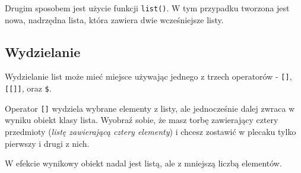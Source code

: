 \documentclass[paper=6in:9in,pagesize=pdftex,headinclude=on,footinclude=on,10pt]{scrbook}
\newenvironment{Shaded}{\begin{snugshade}}{\end{snugshade}}
\newcommand{\CommentTok}[1]{\textcolor[rgb]{0.56,0.35,0.01}{\textit{#1}}}
\newcommand{\DecValTok}[1]{\textcolor[rgb]{0.00,0.00,0.81}{#1}}
\newcommand{\KeywordTok}[1]{\textcolor[rgb]{0.13,0.29,0.53}{\textbf{#1}}}
\newcommand{\NormalTok}[1]{#1}
\newcommand{\StringTok}[1]{\textcolor[rgb]{0.31,0.60,0.02}{#1}}
\begin{document}
Drugim sposobem jest użycie funkcji \texttt{list()}.
W tym przypadku tworzona jest nowa, nadrzędna lista, która zawiera dwie wcześniejsze listy.

\begin{Shaded}
\end{Shaded}

\hypertarget{wydzielanie-list}{%
\subsection{Wydzielanie}\label{wydzielanie-list}}

Wydzielanie list może mieć miejsce używając jednego z trzech operatorów - \texttt{{[}{]}}, \texttt{{[}{[}{]}{]}}, oraz \texttt{\$}.

Operator \texttt{{[}{]}} wydziela wybrane elementy z listy, ale jednocześnie dalej zwraca w wyniku obiekt klasy lista.
Wyobraź sobie, że masz torbę zawierający cztery przedmioty (\emph{listę zawierającą cztery elementy}) i chcesz zostawić w plecaku tylko pierwszy i drugi z nich.

\begin{Shaded}
\end{Shaded}

W efekcie wynikowy obiekt nadal jest listą, ale z mniejszą liczbą elementów.
\end{document}
